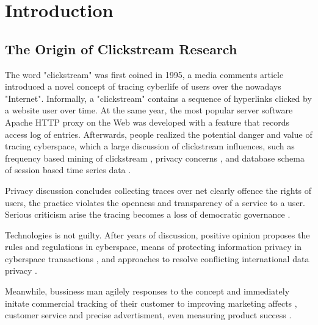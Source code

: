 \section{Introduction}
\label{ch:intro}

\subsection{The Origin of Clickstream Research}



The word "clickstream" \cite{friedman1995} was first coined in 1995, a media comments article 
introduced a novel concept of tracing cyberlife of users over the nowadays "Internet". 
Informally, a "clickstream" contains a sequence of hyperlinks clicked by a website user over time.
At the same year, the most popular server software Apache HTTP \cite{apache1995http} proxy 
on the Web was developed with a feature that records access log of entries.
Afterwards, people realized the potential danger and value of tracing cyberspace, which  a
large discussion of clickstream influences, such as frequency based mining of clickstream \cite{brodwin1995},
privacy concerns \cite{reidenberg1996governing}, and database schema of session based time series data \cite{courtheoux2000database}.


Privacy discussion concludes collecting traces over net clearly offence the rights of users,
the practice violates the openness and transparency of a service to a user.
Serious criticism arise the tracing becomes a loss of democratic governance \cite{gindin1997lost}.

Technologies is not guilty. After years of discussion, positive opinion proposes the rules 
\cite{reidenberg1996governing} and regulations \cite{skok1999establishing} in cyberspace,
means of protecting information privacy in cyberspace transactions \cite{kang1997information},
and approaches to resolve conflicting international data privacy \cite{reidenberg1999resolving}.

Meanwhile, bussiness man agilely responses to the concept and immediately initate 
commercial tracking of their customer to improving marketing affects \cite{novick1995}, 
customer service and precise advertisment\cite{reagle1999platform, bucklin2000sticky}, 
even measuring product success \cite{schonberg2000measuring}.

